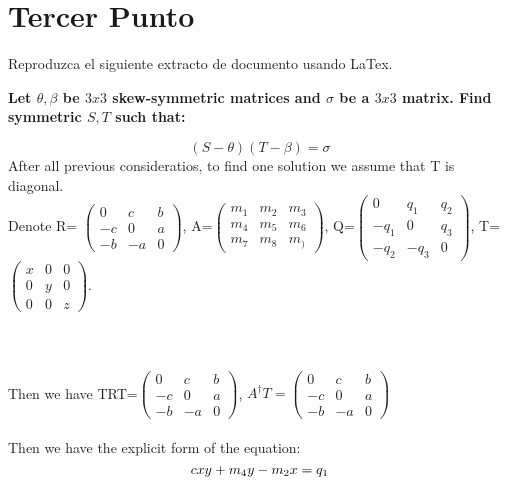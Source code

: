 \documentclass[10pt,onecolumn,letterpaper]{article}
\begin{document}
\section{Tercer Punto}
Reproduzca el siguiente extracto de documento usando LaTex.
\\
\begin{center}
\textbf{Let $\theta,\beta$ be $3x3$ skew-symmetric matrices and $\sigma$ be a $3x3$ matrix. Find symmetric $S,T$ such that:}
\end{center}
$$(S-\theta)(T-\beta)=\sigma$$
After all previous consideratios, to find one solution we assume that T is diagonal.\newline
\\
Denote R= $\begin{pmatrix}\nonumber
	0 & c & b\\
	-c & 0 & a\\
	-b & -a & 0
\end{pmatrix}$, A=$\begin{pmatrix}\nonumber
	m_1 & m_2 & m_3\\
	m_4 & m_5 & m_6\\
	m_7 & m_8 & m_)
\end{pmatrix}$, Q=$\begin{pmatrix}\nonumber
	0 & q_1 & q_2\\
	-q_1 & 0 & q_3\\
	-q_2 & -q_3 & 0
\end{pmatrix}$, T=$\begin{pmatrix}\nonumber
	x & 0 & 0\\
	0 & y & 0\\
	0 & 0 & z
\end{pmatrix}$.\newline
\\
\\
\\
\\
Then we have TRT=$\begin{pmatrix}\nonumber
	0 & c & b\\
	-c & 0 & a\\
	-b & -a & 0
\end{pmatrix}$, $A^{\dagger}T=\begin{pmatrix}\nonumber
	0 & c & b\\
	-c & 0 & a\\
	-b & -a & 0
\end{pmatrix}$ 
\\
\\
Then we have the explicit form of the equation:
\begin{equation}\label{eq1}
cxy+m_4y-m_2x=q_1\\
\end{equation}
\end{document}
